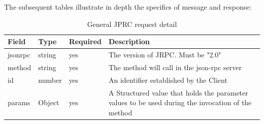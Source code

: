 \documentclass[../Main.tex]{subfiles}
\begin{document}
The subsequent tables illustrate in depth the specifics of message and response:\\

\begin{table}[H]
  \centering
  \begin{tabular}{|l|l|l|p{8cm}|}
\hline
\rowcolor[HTML]{F56B00} 
\textbf{Field} & \textbf{Type} & \textbf{Required} & \textbf{Description}                                                                              \\ \hline
jsonrpc        & string        & yes               & The version of JRPC. Must be "2.0"                                                                \\ \hline
method         & string        & yes               & The method will call in the json-rpc server                                                       \\ \hline
id             & number        & yes               & An identifier established by the Client                                                           \\ \hline
params         & Object        & yes               & A Structured value that holds the parameter values to be used during the invocation of the method \\ \hline
\end{tabular}
  \caption{General JPRC request detail}
  \label{generaljrpc-request-detail}
\end{table}
\end{document}
